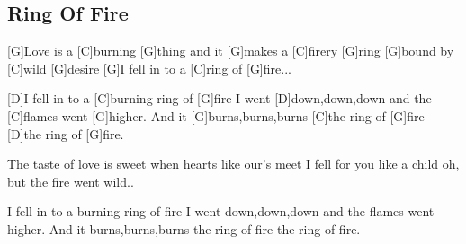 \subsection*{Ring Of Fire   }



\begin{guitar}

[G]Love is a [C]burning [G]thing
and it [G]makes a [C]firery [G]ring
[G]bound by [C]wild [G]desire
[G]I fell in to a [C]ring of [G]fire...


[D]I fell in to a [C]burning ring of [G]fire
I went [D]down,down,down
and the [C]flames went [G]higher.
And it [G]burns,burns,burns
[C]the ring of [G]fire
[D]the ring of [G]fire.


The taste of love is sweet
when hearts like our's meet
I fell for you like a child
oh, but the fire went wild..

I fell in to a burning ring of fire
I went down,down,down
and the flames went higher.
And it burns,burns,burns
the ring of fire
the ring of fire.

\end{guitar}
